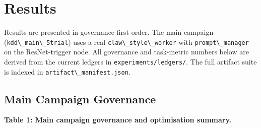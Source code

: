 \section{Results}\label{results}

Results are presented in governance-first order. The main campaign (\passthrough{\lstinline!kdd\_main\_5trial!}) uses a real \passthrough{\lstinline!claw\_style\_worker!} with \passthrough{\lstinline!prompt\_manager!} on the ResNet-trigger node. All governance and task-metric numbers below are derived from the current ledgers in \passthrough{\lstinline!experiments/ledgers/!}. The full artifact suite is indexed in \passthrough{\lstinline!artifact\_manifest.json!}.

\subsection{Main Campaign Governance}\label{main-campaign-governance}

\textbf{Table 1: Main campaign governance and optimisation summary.}

